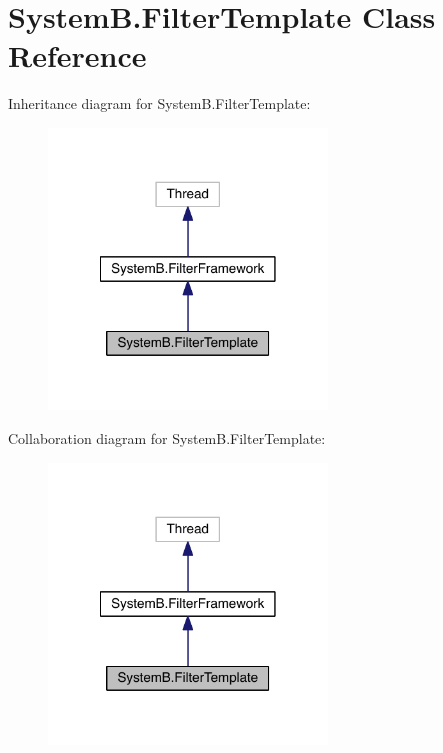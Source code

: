 \hypertarget{class_system_b_1_1_filter_template}{}\section{System\+B.\+Filter\+Template Class Reference}
\label{class_system_b_1_1_filter_template}


Inheritance diagram for System\+B.\+Filter\+Template\+:
\nopagebreak
\begin{figure}[H]
\begin{center}
\leavevmode
\includegraphics[width=210pt]{class_system_b_1_1_filter_template__inherit__graph}
\end{center}
\end{figure}


Collaboration diagram for System\+B.\+Filter\+Template\+:
\nopagebreak
\begin{figure}[H]
\begin{center}
\leavevmode
\includegraphics[width=210pt]{class_system_b_1_1_filter_template__coll__graph}
\end{center}
\end{figure}
